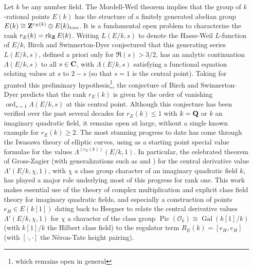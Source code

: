 \documentclass{amsart}
\theoremstyle{definition}
\begin{document}
Let $k$ be any number field. The Mordell-Weil theorem implies that the group of $k$-rational points $E(k)$ has the structure
of a finitely generated abelian group $E(k) \cong {\bf{Z}}^{r_E(k)} \oplus E(k)_{\operatorname{tors}}$.
It is a fundamental open problem to characterize the rank $r_E(k) = \operatorname{rk}_{\bf{Z}} E(k)$. 
Writing $L(E/k, s)$ to denote the Hasse-Weil $L$-function of $E/k$, Birch and Swinnerton-Dyer conjectured
that this generating series $L(E/k, s)$, defined a priori only for $\Re(s) > 3/2$, has an analytic continuation $\Lambda(E/k,s)$ to all $s \in {\bf{C}}$, 
with $\Lambda(E/k, s)$ satisfying a functional equation relating values at $s$ to $2-s$ (so that $s=1$ is the central point). 
Taking for granted this preliminary hypothesis\footnote{which remains open in general}, 
the conjecture of Birch and Swinnerton-Dyer predicts that the rank $r_E(k)$ is given by the 
order of vanishing $\operatorname{ord}_{s=1}\Lambda(E/k, s)$ at this central point. Although 
this conjecture has been verified over the past several decades for $r_E(k) \leq 1$ with $k = {\bf{Q}}$ or $k$ an imaginary quadratic field, 
it remains open at large, without a single known example for $r_E(k) \geq 2$. 
The most stunning progress to date has come through the Iwasawa theory of elliptic curves, 
using as a starting point special value formulae for the values $\Lambda^{(r_E(k))}(E/k, 1)$. 
In particular, the celebrated theorem of Gross-Zagier \cite{GZ} 
(with generalizations such as \cite{YZZ} and \cite{BY}) for the central derivative value $\Lambda'(E/k, \chi, 1)$, 
with $\chi$ a class group character of an imaginary quadratic field $k$, has played a major role underlying most of this progress for rank one. 
This work makes essential use of the theory of complex multiplication and explicit class field theory for imaginary quadratic fields,
and especially a construction of points $e_H \in E(k[1])$ dating back to Heegner to relate the central derivative values $\Lambda'(E/k, \chi, 1)$ 
for $\chi$ a character of the class group $\operatorname{Pic}(\mathcal{O}_k) \cong \operatorname{Gal}(k[1]/k)$ (with $k[1]/k$ the Hilbert class field) 
to the regulator term $R_E(k) = [e_H, e_H]$ (with $[\cdot, \cdot]$ the N\'eron-Tate height pairing). 
\end{document}
